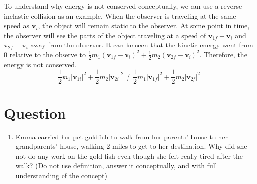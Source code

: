\documentclass[]{article}
\begin{document}
To understand why energy is not conserved conceptually, we can use a reverse inelastic collision as an example. When the observer is traveling at the same speed as $\mathbf{v}_{i}$, the object will remain static to the observer. At some point in time, the observer will see the parts of the object traveling at a speed of $\mathbf{v}_{1f} -\mathbf{v}_{i}$ and  $\mathbf{v}_{2f} -\mathbf{v}_{i}$ away from the observer. It can be seen that the kinetic energy went from $0$ relative to the observe to $\frac{1}{2} m_1(\mathbf{v}_{1f} -\mathbf{v}_{i})^2 + \frac{1}{2} m_2 (\mathbf{v}_{2f} -\mathbf{v}_{i})^2$. Therefore, the energy is not conserved.
$$\frac{1}{2} m_1 |\mathbf{v}_{1i}|^2 + \frac{1}{2} m_2 |\mathbf{v}_{2i}|^2 \neq \frac{1}{2} m_1 |\mathbf{v}_{1f}|^2 + \frac{1}{2} m_2 |\mathbf{v}_{2f}|^2$$


\section{Question}
\begin{enumerate}
	\item Emma carried her pet goldfish to walk from her parents' house to her grandparents' house, walking 2 miles to get to her destination. Why did she not do any work on the gold fish even though she felt really tired after the walk? (Do not use definition, answer it conceptually, and with full understanding of the concept)
\end{enumerate}
\end{document}

